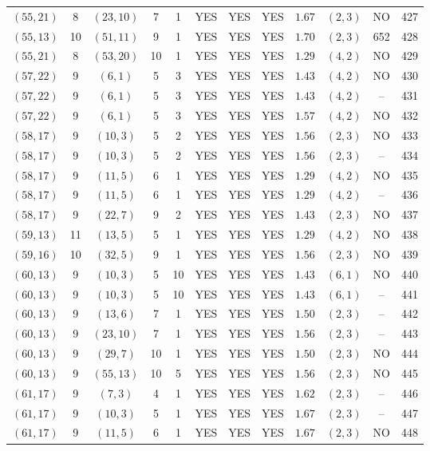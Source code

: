 \begin{longtable}{|c|c|c|c|c|c|c|c|c|c|c|c|}
$(55,21)$ & 8 & $(23,10)$ & 7 & 1 & YES & YES & YES & $1.67$ & $(2,3)$ & NO & 427\\
$(55,13)$ & 10 & $(51,11)$ & 9 & 1 & YES & YES & YES & $1.70$ & $(2,3)$ & 652 & 428\\
$(55,21)$ & 8 & $(53,20)$ & 10 & 1 & YES & YES & YES & $1.29$ & $(4,2)$ & NO & 429\\
$(57,22)$ & 9 & $(6,1)$ & 5 & 3 & YES & YES & YES & $1.43$ & $(4,2)$ & NO & 430\\
$(57,22)$ & 9 & $(6,1)$ & 5 & 3 & YES & YES & YES & $1.43$ & $(4,2)$ & -- & 431\\
$(57,22)$ & 9 & $(6,1)$ & 5 & 3 & YES & YES & YES & $1.57$ & $(4,2)$ & NO & 432\\
$(58,17)$ & 9 & $(10,3)$ & 5 & 2 & YES & YES & YES & $1.56$ & $(2,3)$ & NO & 433\\
$(58,17)$ & 9 & $(10,3)$ & 5 & 2 & YES & YES & YES & $1.56$ & $(2,3)$ & -- & 434\\
$(58,17)$ & 9 & $(11,5)$ & 6 & 1 & YES & YES & YES & $1.29$ & $(4,2)$ & NO & 435\\
$(58,17)$ & 9 & $(11,5)$ & 6 & 1 & YES & YES & YES & $1.29$ & $(4,2)$ & -- & 436\\
$(58,17)$ & 9 & $(22,7)$ & 9 & 2 & YES & YES & YES & $1.43$ & $(2,3)$ & NO & 437\\
$(59,13)$ & 11 & $(13,5)$ & 5 & 1 & YES & YES & YES & $1.29$ & $(4,2)$ & NO & 438\\
$(59,16)$ & 10 & $(32,5)$ & 9 & 1 & YES & YES & YES & $1.56$ & $(2,3)$ & NO & 439\\
$(60,13)$ & 9 & $(10,3)$ & 5 & 10 & YES & YES & YES & $1.43$ & $(6,1)$ & NO & 440\\
$(60,13)$ & 9 & $(10,3)$ & 5 & 10 & YES & YES & YES & $1.43$ & $(6,1)$ & -- & 441\\
$(60,13)$ & 9 & $(13,6)$ & 7 & 1 & YES & YES & YES & $1.50$ & $(2,3)$ & -- & 442\\
$(60,13)$ & 9 & $(23,10)$ & 7 & 1 & YES & YES & YES & $1.56$ & $(2,3)$ & -- & 443\\
$(60,13)$ & 9 & $(29,7)$ & 10 & 1 & YES & YES & YES & $1.50$ & $(2,3)$ & NO & 444\\
$(60,13)$ & 9 & $(55,13)$ & 10 & 5 & YES & YES & YES & $1.56$ & $(2,3)$ & NO & 445\\
$(61,17)$ & 9 & $(7,3)$ & 4 & 1 & YES & YES & YES & $1.62$ & $(2,3)$ & -- & 446\\
$(61,17)$ & 9 & $(10,3)$ & 5 & 1 & YES & YES & YES & $1.67$ & $(2,3)$ & -- & 447\\
$(61,17)$ & 9 & $(11,5)$ & 6 & 1 & YES & YES & YES & $1.67$ & $(2,3)$ & NO & 448\\

\end{longtable}
